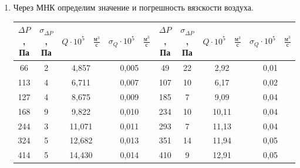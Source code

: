 \documentclass[11pt,a4paper]{article}
\begin{document}
\begin{enumerate}
\item Через МНК определим значение и погрешность вязскости воздуха.

\begin{table}[]
\centering
\begin{tabular}{|c|c|c|c|c|c|c|c|}
\hline
$ \Delta P $, Па & $ \sigma_{\Delta P} $, Па & $ Q \cdot 10^{5} \quad \frac{\text{м}^{3}}{\text{с}}$ & $\sigma_{Q}\cdot 10^5 \quad \frac{\text{м}^{3}}{\text{с}} $ & $ \Delta P $, Па & $ \sigma_{\Delta P} $, Па & $ Q \cdot 10^{5} \quad \frac{\text{м}^{3}}{\text{с}}$ & $\sigma_{Q}\cdot 10^5 \quad \frac{\text{м}^{3}}{\text{с}} $ \\ \hline
66             & 2                       & 4,857                                                     & 0,005                                                      & 49                              & 22                  & 2,92           & 0,01                   \\ \hline
113            & 4                       & 6,711                                                     & 0,007                                                      & 107                             & 10                  & 6,17           & 0,02                   \\ \hline
127            & 4                       & 8,675                                                     & 0,009                                                      & 185                             & 7                   & 9,09           & 0,04                   \\ \hline
168            & 9                       & 9,822                                                     & 0,010                                                      & 234                             & 10                  & 10,11          & 0,04                   \\ \hline
244            & 3                       & 11,071                                                    & 0,011                                                      & 293                             & 7                   & 11,13          & 0,04                   \\ \hline
324            & 5                       & 12,682                                                    & 0,013                                                      & 351                             & 14                  & 11,94          & 0,05                   \\ \hline
414            & 5                       & 14,430                                                    & 0,014                                                      & 410                             & 9                   & 12,91          & 0,05                   \\ \hline

\end{tabular}
\end{table}
\end{enumerate}
\end{document}
